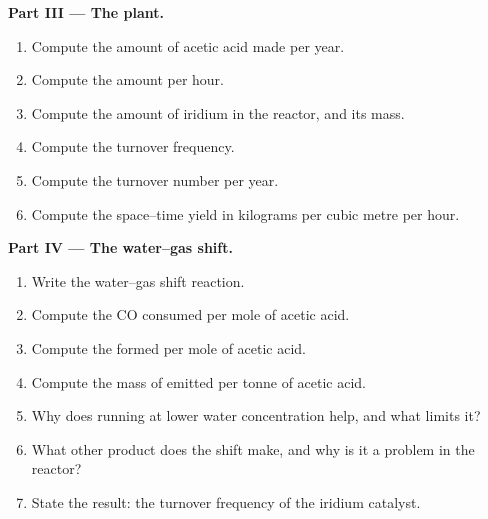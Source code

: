 \begin{problem}
\medskip\noindent\textbf{Part III --- The plant.}
\begin{enumerate}[resume]
  \item Compute the amount of acetic acid made per year.
  \item Compute the amount per hour.
  \item Compute the amount of iridium in the reactor, and its mass.
  \item Compute the turnover frequency.
  \item Compute the turnover number per year.
  \item Compute the space--time yield in kilograms per cubic metre per hour.
\end{enumerate}

\medskip\noindent\textbf{Part IV --- The water--gas shift.}
\begin{enumerate}[resume]
  \item Write the water--gas shift reaction.
  \item Compute the CO consumed per mole of acetic acid.
  \item Compute the  formed per mole of acetic acid.
  \item Compute the mass of  emitted per tonne of acetic acid.
  \item Why does running at lower water concentration help, and what limits it?
  \item What other product does the shift make, and why is it a problem in the
        reactor?
  \item State the result: the turnover frequency of the iridium catalyst.
\end{enumerate}
\end{problem}

